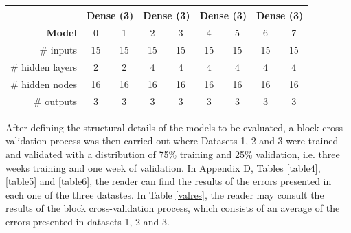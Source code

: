 \begin{table}[htbp]
\begin{tabular}{r|cccccccc}
          & \multicolumn{2}{c}{Dense (3)} & \multicolumn{2}{c}{Dense (3)} & \multicolumn{2}{c}{Dense (3)} & \multicolumn{2}{c}{Dense (3)} \\
    \midrule
    \textbf{Model} & 0     & 1     & 2     & 3     & 4     & 5     & 6     & 7 \\
    \midrule
    \# inputs & 15    & 15    & 15    & 15    & 15    & 15    & 15    & 15 \\
    \# hidden layers & 2     & 2     & 4     & 4     & 4     & 4     & 4     & 4 \\
    \# hidden nodes & 16    & 16    & 16    & 16    & 16    & 16    & 16    & 16 \\
    \# outputs & 3     & 3     & 3     & 3     & 3     & 3     & 3     & 3 \\
    \end{tabular}%
  \label{tableModels}%
\end{table}%

After defining the structural details of the models to be evaluated, a block cross-validation process was then carried out where Datasets 1, 2 and 3 were trained and validated with a distribution of 75\% training and 25\% validation, i.e. three weeks training and one week of validation. In Appendix D, Tables \ref{table4}, \ref{table5} and \ref{table6}, the reader can find the results of the errors presented in each one of the three datastes. In Table \ref{valres}, the reader may consult the results of the block cross-validation process, which consists of an average of the errors presented in datasets 1, 2 and 3.


